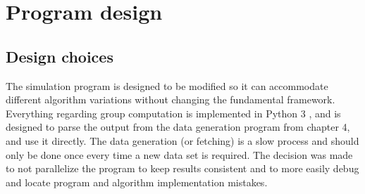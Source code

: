 \section{Program design}
\subsection{Design choices}
The simulation program is designed to be modified so it can accommodate different algorithm variations without changing the fundamental framework.
Everything regarding group computation is implemented in Python 3 \cite{Python3}, and is designed to parse the output from the data generation program from chapter 4, and use it directly.
The data generation (or fetching) is a slow process and should only be done once every time a new data set is required.
The decision was made to not parallelize the program to keep results consistent and to more easily debug and locate program and algorithm implementation mistakes. 

